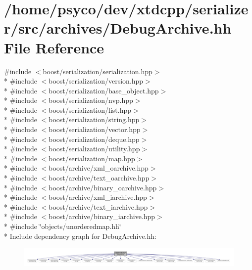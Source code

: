 \hypertarget{DebugArchive_8hh}{}\section{/home/psyco/dev/xtdcpp/serializer/src/archives/\+Debug\+Archive.hh File Reference}
\label{DebugArchive_8hh}
{\ttfamily \#include $<$boost/serialization/serialization.\+hpp$>$}\\*
{\ttfamily \#include $<$boost/serialization/version.\+hpp$>$}\\*
{\ttfamily \#include $<$boost/serialization/base\+\_\+object.\+hpp$>$}\\*
{\ttfamily \#include $<$boost/serialization/nvp.\+hpp$>$}\\*
{\ttfamily \#include $<$boost/serialization/list.\+hpp$>$}\\*
{\ttfamily \#include $<$boost/serialization/string.\+hpp$>$}\\*
{\ttfamily \#include $<$boost/serialization/vector.\+hpp$>$}\\*
{\ttfamily \#include $<$boost/serialization/deque.\+hpp$>$}\\*
{\ttfamily \#include $<$boost/serialization/utility.\+hpp$>$}\\*
{\ttfamily \#include $<$boost/serialization/map.\+hpp$>$}\\*
{\ttfamily \#include $<$boost/archive/xml\+\_\+oarchive.\+hpp$>$}\\*
{\ttfamily \#include $<$boost/archive/text\+\_\+oarchive.\+hpp$>$}\\*
{\ttfamily \#include $<$boost/archive/binary\+\_\+oarchive.\+hpp$>$}\\*
{\ttfamily \#include $<$boost/archive/xml\+\_\+iarchive.\+hpp$>$}\\*
{\ttfamily \#include $<$boost/archive/text\+\_\+iarchive.\+hpp$>$}\\*
{\ttfamily \#include $<$boost/archive/binary\+\_\+iarchive.\+hpp$>$}\\*
{\ttfamily \#include \char`\"{}objects/unorderedmap.\+hh\char`\"{}}\\*
Include dependency graph for Debug\+Archive.\+hh\+:
\nopagebreak
\begin{figure}[H]
\begin{center}
\leavevmode
\includegraphics[width=350pt]{DebugArchive_8hh__incl}
\end{center}
\end{figure}
